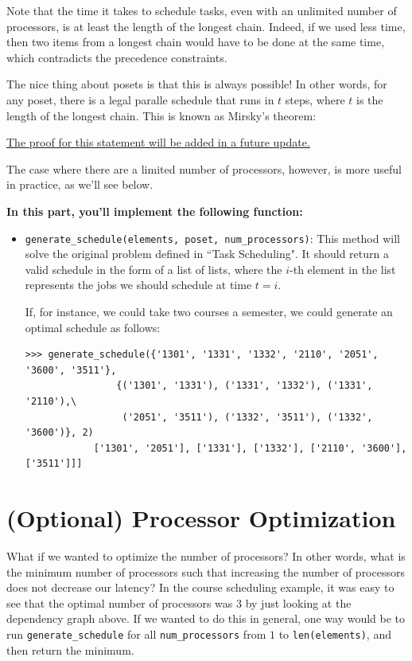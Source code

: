\documentclass{article}
\begin{document}
    Note that the time it takes to schedule tasks, even with an unlimited number of processors, is at least the length of the longest chain. Indeed, if we used less time, then two items from a longest chain would have to be done at the same time, which contradicts the precedence constraints. 


    \vspace{2mm}
    The nice thing about posets is that this is always possible! In other words, for any poset, there is a legal paralle schedule that runs in $t$ steps, where $t$ is the length of the longest chain. This is known as Mirsky's theorem:
    
    \underline{The proof for this statement will be added in a future update.}

    \vspace{2mm}    
    The case where there are a limited number of processors, however, is more useful in practice, as we'll see below.

    \begin{tcolorbox}[colback=yellow!30]
        \textbf{In this part, you'll implement the following function:}
        \begin{itemize}
            \item \lstinline{generate_schedule(elements, poset, num_processors)}:  This method will solve the original problem defined in ``Task Scheduling". It should return a valid schedule in the form of a list of lists, where the $i$-th element in the list represents the jobs we should schedule at time $t = i$.

        If, for instance, we could take two courses a semester, we could generate an optimal schedule as follows:
    \begin{lstlisting}[belowskip=-10pt]
        >>> generate_schedule({'1301', '1331', '1332', '2110', '2051', '3600', '3511'},
                {('1301', '1331'), ('1331', '1332'), ('1331', '2110'),\
                 ('2051', '3511'), ('1332', '3511'), ('1332', '3600')}, 2)
            ['1301', '2051'], ['1331'], ['1332'], ['2110', '3600'], ['3511']]]
    \end{lstlisting}
        \end{itemize}
        
    \end{tcolorbox}



    \section*{(Optional) Processor Optimization}
    What if we wanted to optimize the number of processors? In other words, what is the minimum number of processors such that increasing the number of processors does not decrease our latency? In the course scheduling example, it was easy to see that the optimal number of processors was $3$ by just looking at the dependency graph above. If we wanted to do this in general, one way would be to run \lstinline{generate_schedule} for all \lstinline{num_processors} from $1$ to \lstinline{len(elements)}, and then return the minimum.
\end{document}
